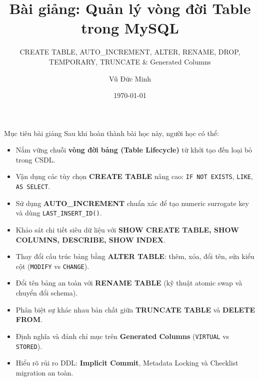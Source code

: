\documentclass[aspectratio=169,11pt]{beamer}
\title[Vòng đời Table trong MySQL]{Bài giảng: Quản lý vòng đời Table trong MySQL}
\subtitle{CREATE TABLE, AUTO\_INCREMENT, ALTER, RENAME, DROP, TEMPORARY, TRUNCATE \& Generated Columns}
\author[Vũ Đức Minh]{Vũ Đức Minh}
\institute[NEU]{Trường Đại học Kinh tế Quốc dân (NEU), Hà Nội, Việt Nam}
\date{\today}
\newcommand{\kw}[1]{\textcolor{dbblue}{\textbf{#1}}}
\begin{document}
\begin{frame}
  \titlepage
\end{frame}

\begin{frame}{Mục tiêu bài giảng}
Sau khi hoàn thành bài học này, người học có thể:
\begin{itemize}\setlength{\itemsep}{1.5pt}
  \item Nắm vững chuỗi \kw{vòng đời bảng (Table Lifecycle)} từ khởi tạo đến loại bỏ trong CSDL.
  \item Vận dụng các tùy chọn \kw{CREATE TABLE} nâng cao: \texttt{IF NOT EXISTS}, \texttt{LIKE}, \texttt{AS SELECT}.
  \item Sử dụng \kw{AUTO\_INCREMENT} chuẩn xác để tạo numeric surrogate key và dùng \texttt{LAST\_INSERT\_ID()}.
  \item Khảo sát chi tiết siêu dữ liệu với \kw{SHOW CREATE TABLE, SHOW COLUMNS, DESCRIBE, SHOW INDEX}.
  \item Thay đổi cấu trúc bảng bằng \kw{ALTER TABLE}: thêm, xóa, đổi tên, sửa kiểu cột (\texttt{MODIFY} vs \texttt{CHANGE}).
  \item Đổi tên bảng an toàn với \kw{RENAME TABLE} (kỹ thuật atomic swap và chuyển đổi schema).
  \item Phân biệt sự khác nhau bản chất giữa \kw{TRUNCATE TABLE} và \kw{DELETE FROM}.
  \item Định nghĩa và đánh chỉ mục trên \kw{Generated Columns} (\texttt{VIRTUAL} vs \texttt{STORED}).
  \item Hiểu rõ rủi ro DDL: \kw{Implicit Commit}, Metadata Locking và Checklist migration an toàn.
\end{itemize}
\end{frame}
\end{document}

